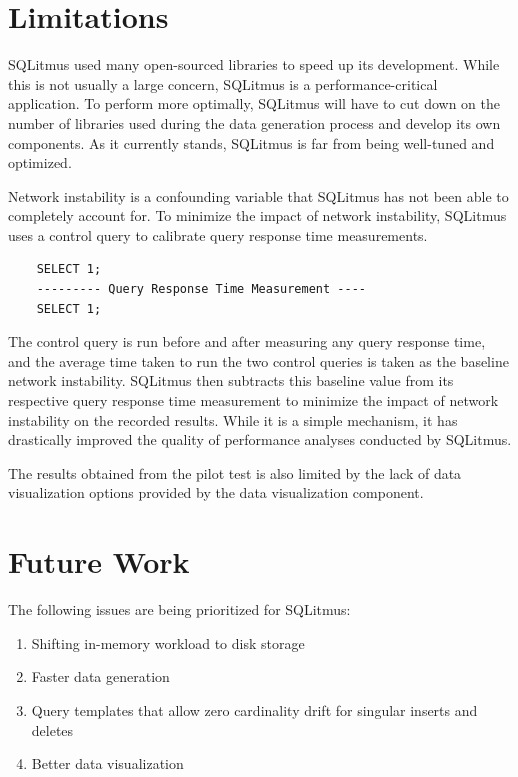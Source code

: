 \documentclass[12pt]{report}
\begin{document}
\begin{spacing}{1.9}
	
	
	\section{Limitations}
	
	SQLitmus used many open-sourced libraries to speed up its development. While this is not usually a large concern, SQLitmus is a performance-critical application. To perform more optimally, SQLitmus will have to cut down on the number of libraries used during the data generation process and develop its own components. As it currently stands, SQLitmus is far from being well-tuned and optimized. 
	
	Network instability is a confounding variable that SQLitmus has not been able to completely account for. To minimize the impact of network instability, SQLitmus uses a control query to calibrate query response time measurements. 
	\begin{verbatim}
	SELECT 1;
	--------- Query Response Time Measurement ----
	SELECT 1;
	\end{verbatim}
	The control query is run before and after measuring any query response time, and the average time taken to run the two control queries is taken as the baseline network instability. SQLitmus then subtracts this baseline value from its respective query response time measurement to minimize the impact of network instability on the recorded results. While it is a simple mechanism, it has drastically improved the quality of performance analyses conducted by SQLitmus.
	
	The results obtained from the pilot test is also limited by the lack of data visualization options provided by the data visualization component.
	
	\section{Future Work}
	
	The following issues are being prioritized for SQLitmus:
	\begin{enumerate}
		\item Shifting in-memory workload to disk storage
		\item Faster data generation
		\item Query templates that allow zero cardinality drift for singular inserts and deletes
		\item Better data visualization
	\end{enumerate}
	

\end{spacing}
\end{document}

